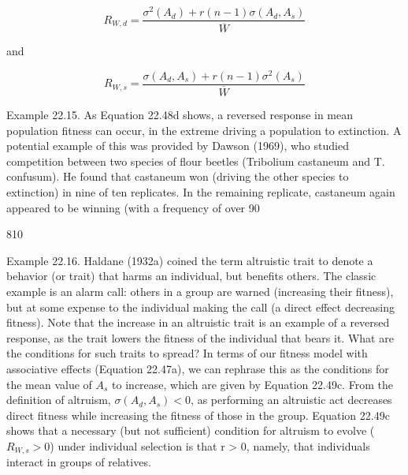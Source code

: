 \documentclass{article}
\begin{document}
\begin{equation}
R_{W,d}=\frac{\sigma^{2}(A_{d})+r(n-1)\sigma(A_{d},A_{s})}{\overline{W}}
\tag{22.49b}
\label{eq:22_49b}
\end{equation}

and

\begin{equation}
R_{W,s}=\frac{\sigma(A_{d},A_{s})+r(n-1)\sigma^{2}(A_{s})}{\overline{W}}
\tag{22.49c}
\label{eq:22_49c}
\end{equation}

Example 22.15. As Equation 22.48d shows, a reversed response in mean population fitness can occur, in the extreme driving a population to extinction. A potential example of this was provided by Dawson (1969), who studied competition between two species of flour beetles (Tribolium castaneum and T. confusum). He found that castaneum won (driving the other species to extinction) in nine of ten replicates. In the remaining replicate, castaneum again appeared to be winning (with a frequency of over 90%

810

Example 22.16. Haldane (1932a) coined the term altruistic trait to denote a behavior (or trait) that harms an individual, but benefits others. The classic example is an alarm call: others in a group are warned (increasing their fitness), but at some expense to the individual making the call (a direct effect decreasing fitness). Note that the increase in an altruistic trait is an example of a reversed response, as the trait lowers the fitness of the individual that bears it. What are the conditions for such traits to spread? In terms of our fitness model with associative effects (Equation 22.47a), we can rephrase this as the conditions for the mean value of  $ A_s $ to increase, which are given by Equation 22.49c. From the definition of altruism,  $ \sigma(A_d, A_s) < 0 $, as performing an altruistic act decreases direct fitness while increasing the fitness of those in the group. Equation 22.49c shows that a necessary (but not sufficient) condition for altruism to evolve ( $ R_{W,s} > 0 $) under individual selection is that r > 0, namely, that individuals interact in groups of relatives.
\end{document}
